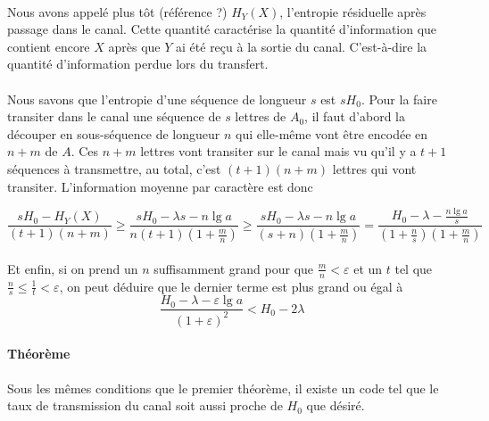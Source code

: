 	\paragraph{}
	Nous avons appelé plus tôt (référence ?) $H_Y(X)$, l'entropie résiduelle après passage dans le canal. Cette quantité caractérise la quantité d'information
	que contient encore $X$ après que $Y$ ai été reçu à la sortie du canal. C'est-à-dire la quantité d'information perdue lors du transfert.
	
	\paragraph{}
	Nous savons que l'entropie d'une séquence de longueur $s$ est $sH_0$. Pour la faire transiter dans le canal une séquence de $s$ lettres de $A_0$, il faut d'abord la découper en sous-séquence de 
	longueur $n$ qui elle-même vont être encodée en $n+m$ de $A$. Ces $n+m$ lettres vont transiter sur le canal mais vu qu'il y a $t+1$ séquences à transmettre,
	au total, c'est $(t+1)(n+m)$ lettres qui vont transiter. L'information moyenne par caractère est donc
	
	\[\frac{sH_0-H_Y(X)}{(t+1)(n+m)} \ge \frac{sH_0-\lambda s-n\lg a}{n(t+1)(1+\frac{m}{n})} \ge 
	\frac{sH_0-\lambda s-n\lg a}{(s+n)(1+\frac{m}{n})} = \frac{H_0-\lambda-\frac{n\lg a}{s}}{(1+\frac{n}{s})(1+\frac{m}{n})}\]
	
	\paragraph{}
	Et enfin, si on prend un $n$ suffisamment grand pour que $\frac{m}{n}<\varepsilon$ et un $t$ tel que $\frac{n}{s} \le \frac{1}{t} < \varepsilon$, on peut 
	déduire que le dernier terme est plus grand ou égal à
	\[\frac{H_0-\lambda-\varepsilon\lg a}{(1+\varepsilon)^2}<H_0-2\lambda\]
	
	
	
	
	
	
	
	
	\paragraph{Théorème}
	Sous les mêmes conditions que le premier théorème, il existe un code tel que le taux de transmission du canal soit aussi proche de $H_0$ que désiré.

